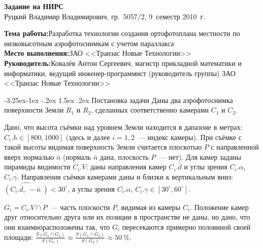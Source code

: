 \documentclass[a4paper,10pt]{article}
\makeatletter
\renewcommand\paragraph{\@startsection{paragraph}{4}{\z@}%
  {-3.25ex\@plus -1ex \@minus -.2ex}%
  {1.5ex \@plus .2ex}%
  {\normalfont\normalsize\bfseries}}
\makeatother
\begin{document}
\begin{center}
\begin{spacing}{1.5}
  {\Large\bfseries Задание на НИРС} \\
  {\large Руцкий Владимир Владимирович, гр.~5057/2, 9~семестр 2010~г.}
\end{spacing}
\end{center}

\noindent\textbf{Тема работы:}\quad Разработка технологии создания ортофотоплана местности по низковысотным аэрофотоснимкам с учетом параллакса \\
\textbf{Место выполнения:}\quad ЗАО <<Транзас Новые Технологии>> \\
\textbf{Руководитель:}\quad Ковалёв Антон Сергеевич, 
магистр прикладной математики и информатики, 
ведущий инженер-программист (руководитель группы) ЗАО <<Транзас Новые Технологии>>

\paragraph{Постановка задачи}
Даны два аэрофотоснимка поверхности Земли $R_1$ и $R_2$, 
сделанных соответственно камерами $C_1$ и $C_2$.

Дано, что высота съёмки над уровнем Земли находится в дапазоне в метрах: $C_i.h \in [800, 1000]$ (здесь и далее $i=1,2$~--- индекс камеры).
При съёмке с такой высоты видимая поверхность Земли считается плоскотью $P$ с направленной вверх нормалью $\bar{n}$
(нормаль $\bar{n}$ дана, плоскость $P$~--- нет).
Для камер заданы пирамиды видимости $C_i.V$: 
даны направления камер $C_i.\bar{d}$ и углы зрения $C_i.\alpha$, $C_i.\gamma$.
Направления съёмки камерами даны и близки к вертикальным вниз: $\widehat{(C_i.\bar{d}, \ -\bar{n}\ )} < 30^{\circ}$,
а углы зрения $C_i.\alpha$, $C_i.\gamma \in [30^{\circ}, 60^{\circ}]$.

$G_i = C_i.V \cap P$~--- часть плоскости $P$, видимая из камеры $C_i$.
Положение камер друг относительно друга или их позиции в пространстве не даны, но
дано, что они взаимнорасположены так, что $G_i$ пересекаются примерно половиной своей площади:
$\frac{S(G_1 \cap G_2)}{S(G_1)} \approx \frac{S(G_1 \cap G_2)}{S(G_2)} \approx 50~\%$.
\end{document}
